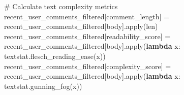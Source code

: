 \documentclass[
  12pt,
  letterpaper,
  DIV=11,
  numbers=noendperiod]{scrartcl}
\newenvironment{Shaded}{\begin{snugshade}}{\end{snugshade}}
\newcommand{\BuiltInTok}[1]{\textcolor[rgb]{0.00,0.23,0.31}{#1}}
\newcommand{\CommentTok}[1]{\textcolor[rgb]{0.37,0.37,0.37}{#1}}
\newcommand{\KeywordTok}[1]{\textcolor[rgb]{0.00,0.23,0.31}{\textbf{#1}}}
\newcommand{\NormalTok}[1]{\textcolor[rgb]{0.00,0.23,0.31}{#1}}
\newcommand{\OperatorTok}[1]{\textcolor[rgb]{0.37,0.37,0.37}{#1}}
\newcommand{\StringTok}[1]{\textcolor[rgb]{0.13,0.47,0.30}{#1}}
\begin{document}
\begin{Shaded}
\begin{Highlighting}[]
\CommentTok{\# Calculate text complexity metrics}
\NormalTok{recent\_user\_comments\_filtered[}\StringTok{\textquotesingle{}comment\_length\textquotesingle{}}\NormalTok{] }\OperatorTok{=}\NormalTok{ recent\_user\_comments\_filtered[}\StringTok{\textquotesingle{}body\textquotesingle{}}\NormalTok{].}\BuiltInTok{apply}\NormalTok{(}\BuiltInTok{len}\NormalTok{)}
\NormalTok{recent\_user\_comments\_filtered[}\StringTok{\textquotesingle{}readability\_score\textquotesingle{}}\NormalTok{] }\OperatorTok{=}\NormalTok{ recent\_user\_comments\_filtered[}\StringTok{\textquotesingle{}body\textquotesingle{}}\NormalTok{].}\BuiltInTok{apply}\NormalTok{(}\KeywordTok{lambda}\NormalTok{ x: textstat.flesch\_reading\_ease(x))}
\NormalTok{recent\_user\_comments\_filtered[}\StringTok{\textquotesingle{}complexity\_score\textquotesingle{}}\NormalTok{] }\OperatorTok{=}\NormalTok{ recent\_user\_comments\_filtered[}\StringTok{\textquotesingle{}body\textquotesingle{}}\NormalTok{].}\BuiltInTok{apply}\NormalTok{(}\KeywordTok{lambda}\NormalTok{ x: textstat.gunning\_fog(x))}


\end{Highlighting}
\end{Shaded}
\end{document}
